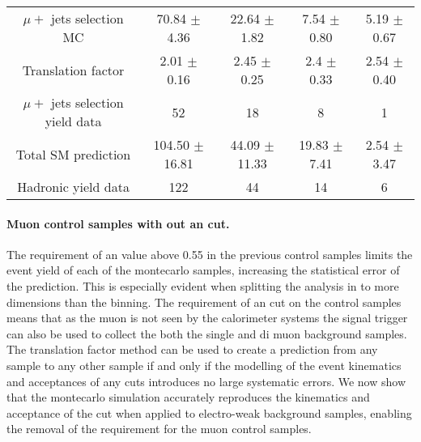 \begin{table}[|h]
\begin{tabular}{ |c|c|c|c|c| }
$\mu +$ jets selection MC         & 70.84  $\pm$  4.36     & 22.64  $\pm$  1.82     & 7.54  $\pm$  0.80     & 5.19  $\pm$  0.67    \\ 
Translation factor                & 2.01  $\pm$  0.16      & 2.45  $\pm$  0.25      & 2.4  $\pm$  0.33     & 2.54  $\pm$  0.40    \\ 
$\mu +$ jets selection yield data & 52                     & 18                     & 8                     & 1                    \\ 
Total SM prediction               & 104.50  $\pm$  16.81   & 44.09  $\pm$  11.33    & 19.83  $\pm$  7.41    & 2.54  $\pm$  3.47    \\ 
Hadronic yield data               & 122                    & 44                     & 14                    & 6                    \\ 
\hline

\end{tabular}
\end{table}

\paragraph{Muon control samples with out an \alt cut.} %
\label{par:muon_control_samples_with_out_an_alt_cut_}
  
The requirement of an \alt value above 0.55 in the previous control samples 
limits the event yield of each of the montecarlo samples, increasing the 
statistical error of the prediction. This is especially evident when splitting 
the analysis in to more dimensions than the \HT binning. The requirement of an 
\alt cut on the control samples means that as the muon is not seen by the 
calorimeter systems the signal trigger can also be used to collect the both the 
single and di muon background samples.
The translation factor method can be used to create a prediction from any 
sample to any other sample if and only if the modelling of the event kinematics 
and acceptances of any cuts introduces no large systematic errors. We now show 
that the montecarlo simulation accurately reproduces the kinematics and 
acceptance of the \alt cut when applied to electro-weak background samples, 
enabling the removal of the \alt requirement for the muon control samples.


